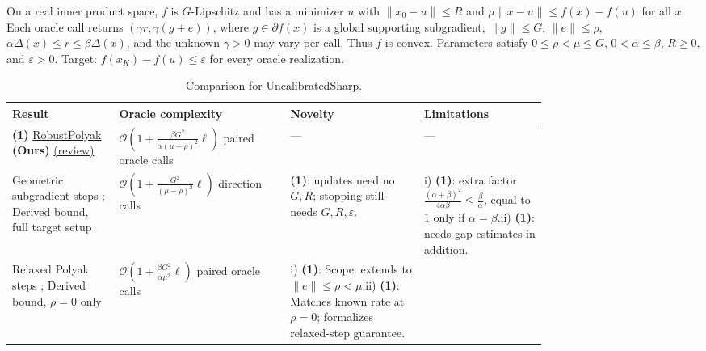 \begin{table}[tp]
\centering
\caption{Comparison for \href{https://github.com/k3nfalt/longtails/blob/main/LongTails/Setups/UncalibratedSharp.lean}{Uncalibrated\allowbreak{}Sharp}.}\label{tab:UncalibratedSharp}
\parbox{\linewidth}{\footnotesize On a real inner product space, $f$ is $G$-Lipschitz and has a minimizer $u$ with $\|x_0-u\|\le R$ and $\mu\|x-u\|\le f(x)-f(u)$ for all $x$. Each oracle call returns $(\gamma r,\gamma(g+e))$, where $g\in\partial f(x)$ is a global supporting subgradient, $\|g\|\le G$, $\|e\|\le\rho$, $\alpha\Delta(x)\le r\le\beta\Delta(x)$, and the unknown $\gamma>0$ may vary per call. Thus $f$ is convex. Parameters satisfy $0\le\rho<\mu\le G$, $0<\alpha\le\beta$, $R\ge0$, and $\varepsilon>0$. Target: $f(x_K)-f(u)\le\varepsilon$ for every oracle realization.}\par\smallskip
\begin{threeparttable}
\footnotesize
\setlength{\tabcolsep}{4pt}\renewcommand{\arraystretch}{1.25}
\begin{tabularx}{\linewidth}{@{}>{\raggedright\arraybackslash}p{0.20\linewidth}>{\raggedright\arraybackslash}p{0.32\linewidth}>{\raggedright\arraybackslash}p{0.25\linewidth}>{\raggedright\arraybackslash}X@{}}
\toprule
\textbf{Result} & \textbf{Oracle complexity} & \textbf{Novelty} & \textbf{Limitations} \\
\midrule
\textbf{(1)} \href{https://github.com/k3nfalt/longtails/blob/main/LongTails/Theorems/RobustPolyak.lean}{Robust\allowbreak{}Polyak} \textbf{(Ours)} \href{https://github.com/k3nfalt/longtails/blob/main/scripts/reviews/RobustPolyak.md}{(review)}
& $\mathcal{O}\!\left(1+\frac{\beta G^2}{\alpha(\mu-\rho)^2}\ell\right)$ paired oracle calls
& ---
& --- \\
\midrule[1.2pt]
Geometric subgradient steps \citep[Sec.~5]{usDavis2018v1}; Derived bound, full target setup
& $\mathcal{O}\!\left(1+\frac{G^2}{(\mu-\rho)^2}\ell\right)$ direction calls
& \textbf{(1)}: updates need no $G,R$; stopping still needs $G,R,\varepsilon$.
& i) \textbf{(1)}: extra factor $\frac{(\alpha+\beta)^2}{4\alpha\beta}\le\frac\beta\alpha$, equal to $1$ only if $\alpha=\beta$.\newline ii) \textbf{(1)}: needs gap estimates in addition. \\
\midrule
Relaxed Polyak steps \citep[Sec.~3]{usDavis2018v1}; Derived bound, $\rho=0$ only
& $\mathcal{O}\!\left(1+\frac{\beta G^2}{\alpha\mu^2}\ell\right)$ paired oracle calls
& i) \textbf{(1)}: Scope: extends to $\|e\|\le\rho<\mu$.\newline ii) \textbf{(1)}: Matches known rate at $\rho=0$; formalizes relaxed-step guarantee.

\end{tabularx}
\end{threeparttable}
\end{table}
